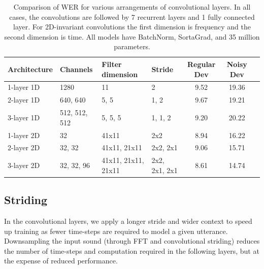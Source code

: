 \documentclass{article}
\begin{document}
\begin{table}
\centering
\begin{tabular}{l l l l c c c}
\toprule
Architecture & Channels      & Filter dimension    & Stride        & Regular Dev & Noisy Dev \\
\midrule
1-layer 1D   & 1280          & 11                  & 2             & 9.52        & 19.36 \\
2-layer 1D   & 640, 640      & 5, 5                & 1, 2          & 9.67        & 19.21 \\
3-layer 1D   & 512, 512, 512 & 5, 5, 5             & 1, 1, 2       & 9.20        & 20.22 \\
1-layer 2D   & 32            & 41x11               & 2x2           & 8.94        & 16.22 \\
2-layer 2D   & 32, 32        & 41x11, 21x11        & 2x2, 2x1      & 9.06        & 15.71 \\
3-layer 2D   & 32, 32, 96    & 41x11, 21x11, 21x11 & 2x2, 2x1, 2x1 & 8.61        & 14.74 \\
\bottomrule
\end{tabular}
\caption{Comparison of WER for various arrangements of convolutional layers. In all cases, the convolutions are followed by 7 recurrent layers and 1 fully connected layer. For 2D-invariant convolutions the first dimension is frequency and the second dimension is time. All models have BatchNorm, SortaGrad, and 35 million parameters.}
\label{table:2dconv}
\end{table}

\subsection{Striding}

In the convolutional layers, we apply a longer stride and wider context to speed up training as fewer time-steps are required to model a given utterance. Downsampling the input sound (through FFT and convolutional striding) reduces the number of time-steps and computation required in the following layers, but at the expense of reduced performance. 
\end{document}
